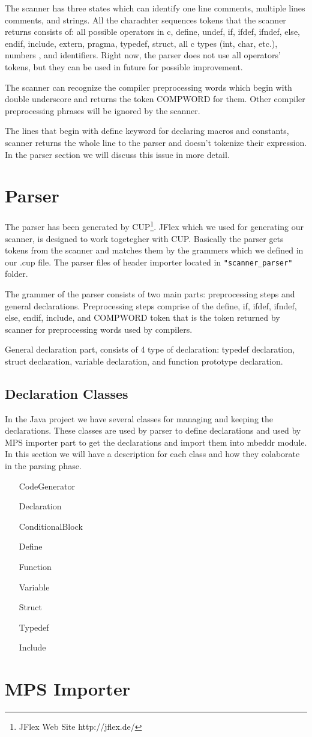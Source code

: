 \documentclass{article}
\begin{document}
The scanner has three states which can identify one line comments, multiple lines comments, and strings. All the charachter sequences tokens that the scanner returns consists of: all possible operators in c, define, undef, if, ifdef, ifndef, else, endif, include, extern, pragma, typedef, struct, all c types (int, char, etc.), numbers , and identifiers. Right now, the parser does not use all operators' tokens, but they can be used in future for possible improvement.

The scanner can recognize the compiler preprocessing words which begin with double underscore and returns the token COMPWORD for them. Other compiler preprocessing phrases will be ignored by the scanner.

The lines that begin with define keyword for declaring macros and constants, scanner returns the whole line to the parser and doesn't tokenize their expression. In the parser section we will discuss this issue in more detail.


\section{Parser}
The parser has been generated by CUP\footnote{JFlex Web Site http://jflex.de/}. JFlex which we used for generating our scanner, is designed to work togetegher with CUP. Basically the parser gets tokens from the scanner and matches them by the grammers which we defined in our .cup file. The parser files of header importer located in \texttt{"scanner\_parser"} folder.

The grammer of the parser consists of two main parts: preprocessing steps and general declarations. Preprocessing steps comprise of the define, if, ifdef, ifndef, else, endif, include, and COMPWORD token that is the token returned by scanner for preprocessing words used by compilers.

General declaration part, consists of 4 type of declaration: typedef declaration, struct declaration, variable declaration, and function prototype declaration.

\subsection{Declaration Classes}
In the Java project we have several classes for managing and keeping the declarations. These classes are used by parser to define declarations and used by MPS importer part to get the declarations and import them into mbeddr module. In this section we will have a description for each class and how they colaborate in the parsing phase.

\begin{itemize}
\item[CodeGenerator]
\item[Declaration]
\item[ConditionalBlock]
\item[Define]
\item[Function]
\item[Variable]
\item[Struct]
\item[Typedef]
\item[Include]
\end{itemize}

\section{MPS Importer}
\end{document}

